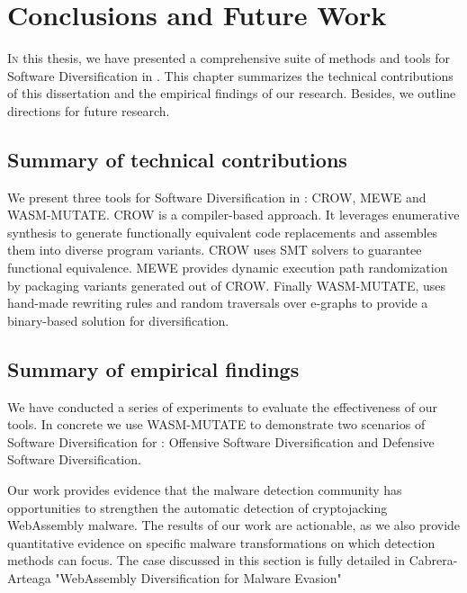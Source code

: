 
\chapter{Conclusions and Future Work}
\label{results}

\lettrine[lines=4]{I}{n} this thesis, we have presented a comprehensive suite of methods and tools for Software Diversification in \Wasm.
This chapter summarizes the technical contributions of this dissertation and the empirical findings of our research.
Besides, we outline directions for future research.

\section{Summary of technical contributions}

We present three tools for Software Diversification in \Wasm: CROW, MEWE and WASM-MUTATE.
CROW is a compiler-based approach.
It leverages enumerative synthesis to generate functionally equivalent code replacements and assembles them into diverse \wasm program variants. 
CROW uses SMT solvers to guarantee functional equivalence.
MEWE provides dynamic execution path randomization by packaging variants generated out of CROW.
Finally WASM-MUTATE, uses hand-made rewriting rules and random traversals over e-graphs to provide a binary-based solution for \Wasm diversification.





\section{Summary of empirical findings}

We have conducted a series of experiments to evaluate the effectiveness of our tools.
In concrete we use WASM-MUTATE to demonstrate two scenarios of Software Diversification for \Wasm: Offensive Software Diversification and Defensive Software Diversification.

Our work provides evidence that the malware detection community has opportunities to strengthen the automatic detection of cryptojacking WebAssembly malware. 
The results of our work are actionable, as we also provide quantitative evidence on specific malware transformations on which detection methods can focus. 
The case discussed in this section is fully detailed in Cabrera-Arteaga \etal "WebAssembly Diversification for Malware Evasion"

